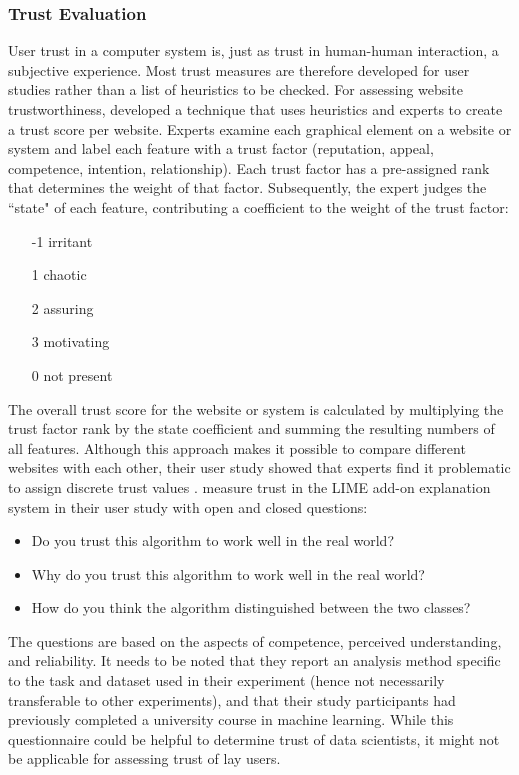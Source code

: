 \subsubsection{Trust Evaluation}
User trust in a computer system is, just as trust in human-human interaction, a subjective experience. Most trust measures are therefore developed for user studies rather than a list of heuristics to be checked. \newline
For assessing website trustworthiness, \cite{bedi2006assessing} developed a technique that uses heuristics and experts to create a trust score per website. Experts examine each graphical element on a website or system and label each feature with a trust factor (reputation, appeal, competence, intention, relationship). Each trust factor has a pre-assigned rank that determines the weight of that factor. Subsequently, the expert judges the ``state" of each feature, contributing a coefficient to the weight of the trust factor:
\begin{itemize}
	\item [-1] irritant
	\item [1] chaotic
	\item [2] assuring
	\item [3] motivating
	\item [0] not present
\end{itemize}
The overall trust score for the website or system is calculated by multiplying the trust factor rank by the state coefficient and summing the resulting numbers of all features. Although this approach makes it possible to compare different websites with each other, their user study showed that experts find it problematic to assign discrete trust values \cite{bedi2006assessing}. \newline
\cite{ribeiro2016should} measure trust in the LIME add-on explanation system in their user study with open and closed questions:
\begin{itemize}
	\item Do you trust this algorithm to work well in the real world?
	\item Why do you trust this algorithm to work well in the real world?
	\item How do you think the algorithm distinguished between the two classes?
\end{itemize}
The questions are based on the aspects of competence, perceived understanding, and reliability. It needs to be noted that they report an analysis method specific to the task and dataset used in their experiment (hence not necessarily transferable to other experiments), and that their study participants had previously completed a university course in machine learning. While this questionnaire could be helpful to determine trust of data scientists, it might not be applicable for assessing trust of lay users.\newline
